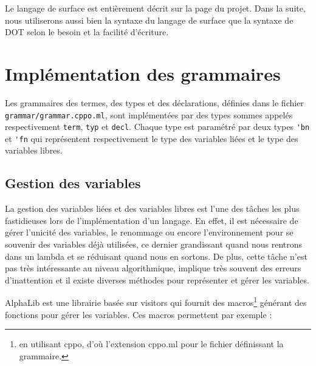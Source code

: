 
Le langage de surface est entièrement décrit sur la page du
projet\cite{rml-github}. Dans la suite, nous
utiliserons aussi bien la syntaxe du langage de surface que la syntaxe de DOT
selon le besoin et la facilité d'écriture.

\section{Implémentation des grammaires}

Les grammaires des termes, des types et des déclarations, définies dans le
fichier \verb|grammar/grammar.cppo.ml|, sont implémentées par des types sommes
appelés respectivement \verb|term|, \verb|typ| et \verb|decl|. Chaque type est
paramétré par deux types \verb|'bn| et \verb|'fn| qui représentent
respectivement le type des variables liées et le type des variables libres.

\subsection*{Gestion des variables}

La gestion des variables liées et des variables libres est l'une des tâches les plus
fastidieuses lors de l'implémentation d'un langage. En effet, il
est nécessaire de gérer l'unicité des variables, le renommage ou encore l'environnement
pour se souvenir des variables déjà utilisées, ce dernier grandissant quand nous
rentrons dans un lambda et se réduisant quand nous en sortons. De plus,
cette tâche n'est pas très intéressante au niveau algorithmique, implique très
souvent des erreurs d'inattention et il existe diverses méthodes pour
représenter et gérer les variables.

AlphaLib\cite{alphalib} est une librairie basée sur
visitors\cite{visitors} qui fournit des macros\footnote{en utilisant
  cppo, d'où l'extension cppo.ml pour le fichier définissant la grammaire.}
générant des fonctions pour gérer les variables. Ces macros permettent par
exemple :

